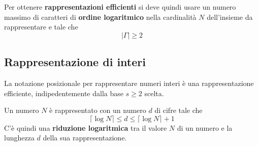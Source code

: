 Per ottenere \textbf{rappresentazioni efficienti} si deve quindi usare un numero massimo di caratteri di
\textbf{ordine logaritmico} nella cardinalit\`a $N$ dell'insieme da rappresentare e tale che
\[ | \Gamma | \geq 2 \]

\subsection{Rappresentazione di interi}
La notazione posizionale per rappresentare numeri interi \`e una rappresentazione efficiente, indipedentemente dalla
base $s \geq 2$ scelta.

Un numero $N$ \`e rappresentato con un numero $d$ di cifre tale che
\[ \lceil \log N \rceil \leq d \leq \lceil \log N \rceil + 1 \]
C'\`e quindi una \textbf{riduzione logaritmica} tra il valore $N$ di un numero e la lunghezza $d$ della sua
rappresentazione.